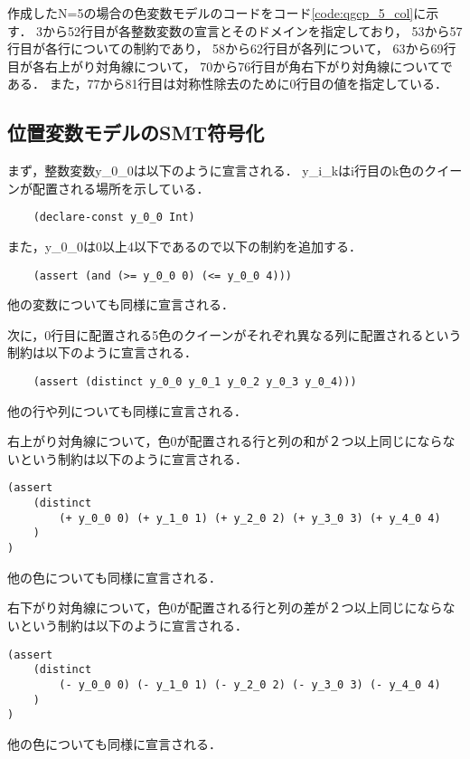 作成したN=5の場合の色変数モデルのコードをコード\ref{code:qgcp_5_col}に示す．
3から52行目が各整数変数の宣言とそのドメインを指定しており，
53から57行目が各行についての制約であり，
58から62行目が各列について，
63から69行目が各右上がり対角線について，
70から76行目が角右下がり対角線についてである．
また，77から81行目は対称性除去のために0行目の値を指定している．




\subsection{位置変数モデルのSMT符号化}
まず，整数変数y\_0\_0は以下のように宣言される．
y\_i\_kはi行目のk色のクイーンが配置される場所を示している．
{ \footnotesize \begin{verbatim}
    (declare-const y_0_0 Int)
\end{verbatim}}
また，y\_0\_0は0以上4以下であるので以下の制約を追加する．
{ \footnotesize \begin{verbatim}
    (assert (and (>= y_0_0 0) (<= y_0_0 4)))
\end{verbatim}}
他の変数についても同様に宣言される．

次に，0行目に配置される5色のクイーンがそれぞれ異なる列に配置されるという制約は以下のように宣言される．
{ \footnotesize \begin{verbatim}
    (assert (distinct y_0_0 y_0_1 y_0_2 y_0_3 y_0_4)))
\end{verbatim}}
他の行や列についても同様に宣言される．

右上がり対角線について，色0が配置される行と列の和が２つ以上同じにならないという制約は以下のように宣言される．
{ \footnotesize \begin{verbatim}
(assert 
    (distinct 
        (+ y_0_0 0) (+ y_1_0 1) (+ y_2_0 2) (+ y_3_0 3) (+ y_4_0 4)
    )
)
\end{verbatim}}
他の色についても同様に宣言される．

右下がり対角線について，色0が配置される行と列の差が２つ以上同じにならないという制約は以下のように宣言される．
{ \footnotesize \begin{verbatim}
(assert 
    (distinct 
        (- y_0_0 0) (- y_1_0 1) (- y_2_0 2) (- y_3_0 3) (- y_4_0 4)
    )
)
\end{verbatim}}
他の色についても同様に宣言される．


